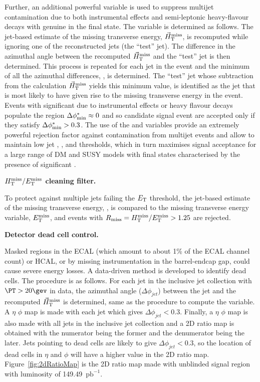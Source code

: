 Further, an additional powerful variable \bdphi is used to suppress
multijet contamination due to both instrumental effects and
semi-leptonic heavy-flavour decays with genuine \met in the final
state. The variable is determined as follows. The jet-based estimate
of the missing transverse energy, ${\mbox{$\vec{H}_{\rm T}^{\rm miss}$}}$, is recomputed while
ignoring one of the reconstructed jets (the ``test'' jet). The
difference in the azimuthal angle between the recomputed $\mbox{$\vec{H}_{\rm T}^{\rm miss}$}$
and the ``test'' jet is then determined. This process is repeated for
each jet in the event and the minimum of all the azimuthal
differences, \bdphi, is determined. The ``test'' jet whose subtraction
from the calculation $\mbox{$\vec{H}_{\rm T}^{\rm miss}$}$ yields this minimum value, is
identified as the jet that is most likely to have given rise to the
missing transverse energy in the event. Events with significant \mht
due to instrumental effects or heavy flavour decays populate the
region $\mbox{$\Delta\phi^{*}_{\rm min}$} \approx 0$ and so candidate signal event are accepted
only if they satisfy $\mbox{$\Delta\phi^{*}_{\rm min}$} > 0.3$. The use of the \bdphi and \alphat
variables provide an extremely powerful rejection factor against
contamination from multijet events and allow to maintain low jet \PT,
\HT, and \mht thresholds, which in turn maximises signal acceptance
for a large range of DM and SUSY models with final states
characterised by the presence of significant \met.

{\bf $\mbox{$H_{\rm T}^{\rm miss}$}/\mbox{$E_\text{T}^{\rm miss}$}$ cleaning filter.} 

To protect against multiple jets failing the ${E_{\text T}}$ threshold, the jet-based
estimate of the missing transverse energy, \mht, is compared to the
missing transverse energy variable, $\mbox{$E_\text{T}^{\rm miss}$}$, and events with $R_{\rm
  miss}=\mbox{$H_{\rm T}^{\rm miss}$}/\mbox{$E_\text{T}^{\rm miss}$} > 1.25$ are rejected.
  
{\bf Detector dead cell control.}

Masked regions in the ECAL (which amount to about 1\% of the ECAL channel count)
or HCAL, or by missing instrumentation in the barrel-endcap gap, could cause 
severe energy losses. A data-driven method is developed to identify dead cells. The 
procedure is as follows. For each jet in the inclusive jet collection with
$\PT > 20 \gev$ in data, the azimuthal angle ($\Delta\phi_{jet}$) between the jet and the 
recomputed ${\mbox{$\vec{H}_{\rm T}^{\rm miss}$}}$ is determined, same as the procedure to compute the \bdphi 
variable. A $\eta$ $\phi$ map is made with each jet which gives $\Delta\phi_{jet} < 0.3$.
Finally, a $\eta$ $\phi$ map is also made with all jets in the inclusive jet collection and
a 2D ratio map is obtained with the numerator being the former and the denumerator being 
the later. Jets pointing to dead cells are likely to give $\Delta\phi_{jet} < 0.3$, so the
location of dead cells in $\eta$ and $\phi$ will have a higher value in the 2D ratio map. 
Figure~\ref{fig:2dRatioMap} is the 2D ratio map made with unblinded signal region with luminosity of 
149.49~$\text{pb}^{-1}$.

